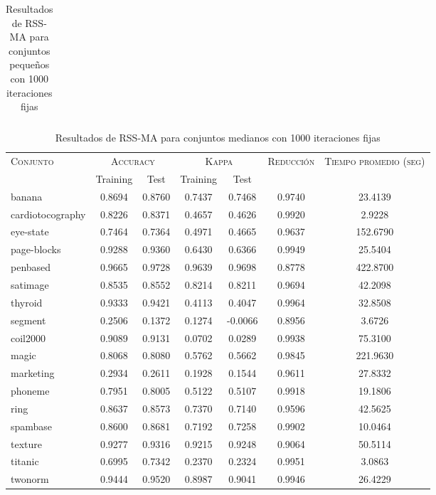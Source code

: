 \begin{table}[]
\begin{tabular}{l c c c c c c}
\hline
\end{tabular}
\caption{Resultados de RSS-MA para conjuntos pequeños con 1000 iteraciones fijas}
\label{res-peq-RSS-MA}
\end{table}

\begin{table}[]
\centering
\begin{tabular}{l c c c c c c}
\hline
\multirow{2}{*}{\textsc{Conjunto}}
	& \multicolumn{2}{c}{\textsc{Accuracy}}
	& \multicolumn{2}{c}{\textsc{Kappa}}
	& \textsc{Reducción}
	& \textsc{Tiempo promedio (seg)} \\
	& Training & Test
	& Training & Test \\ 
\hline
\hline

banana & 0.8694 & 0.8760 & 0.7437 & 0.7468 & 0.9740 & 23.4139 \\
cardiotocography & 0.8226 & 0.8371 & 0.4657 & 0.4626 & 0.9920 & 2.9228 \\
eye-state & 0.7464 & 0.7364 & 0.4971 & 0.4665 & 0.9637 & 152.6790 \\
page-blocks & 0.9288 & 0.9360 & 0.6430 & 0.6366 & 0.9949 & 25.5404 \\
penbased & 0.9665 & 0.9728 & 0.9639 & 0.9698 & 0.8778 & 422.8700 \\
satimage & 0.8535 & 0.8552 & 0.8214 & 0.8211 & 0.9694 & 42.2098 \\
thyroid & 0.9333 & 0.9421 & 0.4113 & 0.4047 & 0.9964 & 32.8508 \\
segment & 0.2506 & 0.1372 & 0.1274 & -0.0066 & 0.8956 & 3.6726 \\
coil2000 & 0.9089 & 0.9131 & 0.0702 & 0.0289 & 0.9938 & 75.3100 \\
magic & 0.8068 & 0.8080 & 0.5762 & 0.5662 & 0.9845 & 221.9630 \\
marketing & 0.2934 & 0.2611 & 0.1928 & 0.1544 & 0.9611 & 27.8332 \\
phoneme & 0.7951 & 0.8005 & 0.5122 & 0.5107 & 0.9918 & 19.1806 \\
ring & 0.8637 & 0.8573 & 0.7370 & 0.7140 & 0.9596 & 42.5625 \\
spambase & 0.8600 & 0.8681 & 0.7192 & 0.7258 & 0.9902 & 10.0464 \\
texture & 0.9277 & 0.9316 & 0.9215 & 0.9248 & 0.9064 & 50.5114 \\
titanic & 0.6995 & 0.7342 & 0.2370 & 0.2324 & 0.9951 & 3.0863 \\
twonorm & 0.9444 & 0.9520 & 0.8987 & 0.9041 & 0.9946 & 26.4229 \\

\hline
\end{tabular}
\caption{Resultados de RSS-MA para conjuntos medianos con 1000 iteraciones fijas}
\label{res-med-RSS-MA}
\end{table}




